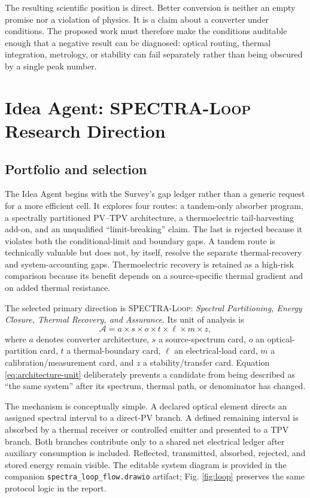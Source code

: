 \documentclass[conference]{../../../../Conference-LaTeX-template_10-17-19/IEEEtran}
\newcommand{\spectraloop}{\textsc{SPECTRA-Loop}}
\begin{document}
The resulting scientific position is direct. Better conversion is neither an empty promise nor a violation of physics. It is a claim about a converter under conditions. The proposed work must therefore make the conditions auditable enough that a negative result can be diagnosed: optical routing, thermal integration, metrology, or stability can fail separately rather than being obscured by a single peak number.

\section{Idea Agent: \spectraloop{} Research Direction}
\subsection{Portfolio and selection}
The Idea Agent begins with the Survey's gap ledger rather than a generic request for a more efficient cell. It explores four routes: a tandem-only absorber program, a spectrally partitioned PV--TPV architecture, a thermoelectric tail-harvesting add-on, and an unqualified ``limit-breaking'' claim. The last is rejected because it violates both the conditional-limit and boundary gaps. A tandem route is technically valuable but does not, by itself, resolve the separate thermal-recovery and system-accounting gaps. Thermoelectric recovery is retained as a high-risk comparison because its benefit depends on a source-specific thermal gradient and on added thermal resistance.

The selected primary direction is \spectraloop{}: \emph{Spectral Partitioning, Energy Closure, Thermal Recovery, and Assurance}. Its unit of analysis is
\begin{equation}
\mathcal{A}=a\times s\times o\times t\times \ell\times m\times z,
\label{eq:architecture-unit}
\end{equation}
where $a$ denotes converter architecture, $s$ a source-spectrum card, $o$ an optical-partition card, $t$ a thermal-boundary card, $\ell$ an electrical-load card, $m$ a calibration/measurement card, and $z$ a stability/transfer card. Equation \eqref{eq:architecture-unit} deliberately prevents a candidate from being described as ``the same system'' after its spectrum, thermal path, or denominator has changed.

The mechanism is conceptually simple. A declared optical element directs an assigned spectral interval to a direct-PV branch. A defined remaining interval is absorbed by a thermal receiver or controlled emitter and presented to a TPV branch. Both branches contribute only to a shared net electrical ledger after auxiliary consumption is included. Reflected, transmitted, absorbed, rejected, and stored energy remain visible. The editable system diagram is provided in the companion \texttt{spectra\_loop\_flow.drawio} artifact; Fig. \ref{fig:loop} preserves the same protocol logic in the report.
\end{document}
